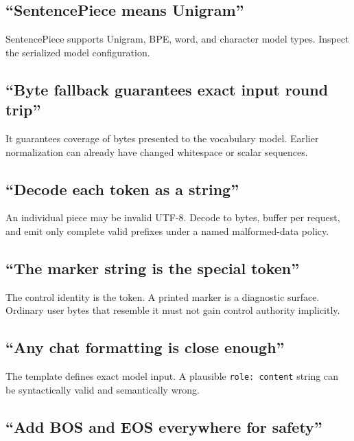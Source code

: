 \subsection{``SentencePiece means
Unigram''}\label{sentencepiece-means-unigram}

SentencePiece supports Unigram, BPE, word, and character model types.
Inspect the serialized model configuration.

\subsection{``Byte fallback guarantees exact input round
trip''}\label{byte-fallback-guarantees-exact-input-round-trip}

It guarantees coverage of bytes presented to the vocabulary model.
Earlier normalization can already have changed whitespace or scalar
sequences.

\subsection{``Decode each token as a
string''}\label{decode-each-token-as-a-string}

An individual piece may be invalid UTF-8. Decode to bytes, buffer per
request, and emit only complete valid prefixes under a named
malformed-data policy.

\subsection{``The marker string is the special
token''}\label{the-marker-string-is-the-special-token}

The control identity is the token. A printed marker is a diagnostic
surface. Ordinary user bytes that resemble it must not gain control
authority implicitly.

\subsection{``Any chat formatting is close
enough''}\label{any-chat-formatting-is-close-enough}

The template defines exact model input. A plausible
\texttt{role:\ content} string can be syntactically valid and
semantically wrong.

\subsection{``Add BOS and EOS everywhere for
safety''}\label{add-bos-and-eos-everywhere-for-safety}

